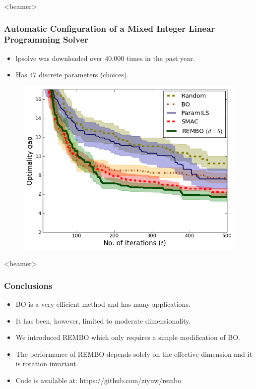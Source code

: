 \documentclass[grey]{beamer}
\begin{document}
 
 \begin{frame}<beamer>
 \frametitle{Automatic Configuration of a Mixed Integer
Linear Programming Solver}
   \begin{itemize}
   \small
   \item lpsolve was downloaded over 40,000 times in the past year.
   \item Has 47 discrete parameters (choices).
  \end{itemize}
  \begin{figure}[h!]
   \begin{center}
     \includegraphics[width=0.7\columnwidth]{../paper/figures/lpsolve.png}     
   \label{fig:lpsolve}
   \end{center}
   \vspace*{-3mm}
  \end{figure}
 \end{frame}
 
 \begin{frame}<beamer>
 \frametitle{Conclusions}
  \begin{itemize}
   \item BO is a very efficient method and has many applications.
   \item It has been, however, limited to moderate dimensionality.
   \item We introduced REMBO which only requires a simple modification of BO.
   \item The performance of REMBO depends solely on the effective dimension and it is rotation invariant.
   \item Code is available at: https://github.com/ziyuw/rembo


  \end{itemize}

 \end{frame}
 
\end{document}

